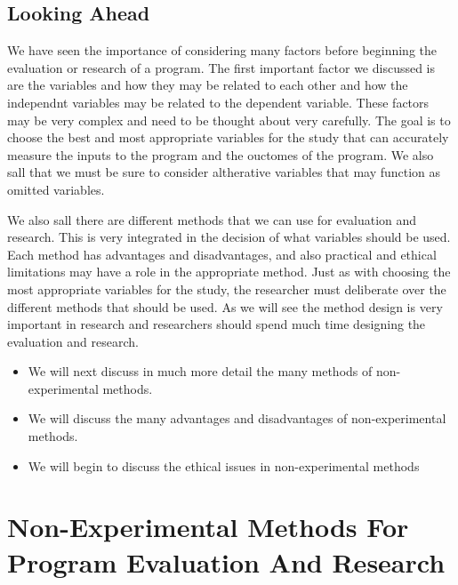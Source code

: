 \documentclass[]{book}
\providecommand{\tightlist}{%
  \setlength{\itemsep}{0pt}\setlength{\parskip}{0pt}}
\theoremstyle{definition}
\theoremstyle{definition}
\theoremstyle{definition}
\theoremstyle{remark}
\begin{document}
\hypertarget{looking-ahead-5}{%
\section{Looking Ahead}\label{looking-ahead-5}}

We have seen the importance of considering many factors before beginning
the evaluation or research of a program. The first important factor we
discussed is are the variables and how they may be related to each other
and how the independnt variables may be related to the dependent
variable. These factors may be very complex and need to be thought about
very carefully. The goal is to choose the best and most appropriate
variables for the study that can accurately measure the inputs to the
program and the ouctomes of the program. We also sall that we must be
sure to consider altherative variables that may function as omitted
variables.

We also sall there are different methods that we can use for evaluation
and research. This is very integrated in the decision of what variables
should be used. Each method has advantages and disadvantages, and also
practical and ethical limitations may have a role in the appropriate
method. Just as with choosing the most appropriate variables for the
study, the researcher must deliberate over the different methods that
should be used. As we will see the method design is very important in
research and researchers should spend much time designing the evaluation
and research.

\begin{itemize}
\tightlist
\item
  We will next discuss in much more detail the many methods of
  non-experimental methods.
\item
  We will discuss the many advantages and disadvantages of
  non-experimental methods.
\item
  We will begin to discuss the ethical issues in non-experimental
  methods
\end{itemize}

\hypertarget{non-experimental-methods-for-program-evaluation-and-research}{%
\chapter{Non-Experimental Methods For Program Evaluation And
Research}\label{non-experimental-methods-for-program-evaluation-and-research}}
\end{document}
